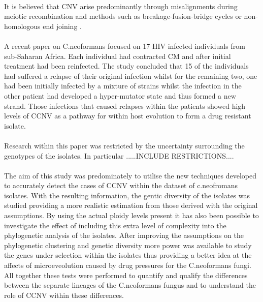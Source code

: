 \documentclass[11pt]{article}
\begin{document}
\paragraph{}It is believed that CNV arise predominantly through misalignments during meiotic recombination and methods such as breakage-fusion-bridge cycles or non-homologous end joining \autocite{Hastings2010}. 
\paragraph{}A recent paper on C.neoformans \autocite{Rhodes2017} focused on 17 HIV infected individuals from sub-Saharan Africa. Each individual had contracted CM and after initial treatment had been reinfected. The study concluded that 15 of the individuals had suffered a relapse of their original infection whilst for the remaining two, one had been initially infected by a mixture of strains whilst the infection in the other patient had developed a hyper-mutator state and thus formed a new strand. Those infections that caused relapses within the patients showed high levels of CCNV as a pathway for within host evolution to form a drug resistant isolate. 
\paragraph{}Research within this paper was restricted by the uncertainty surrounding the genotypes of the isolates. In particular .....INCLUDE RESTRICTIONS.... 
\paragraph{}The aim of this study was predominately to utilise the new techniques developed to accurately detect the cases of CCNV within the dataset of c.neofromans isolates. With the resulting information, the gentic diversity of the isolates was studied providing a more realistic estimation from those derived with the original assumptions. By using the actual ploidy levels present it has also been possible to investigate the effect of including this extra level of complexity into the phylogenetic analysis of the isolates. After improving the assumptions on the phylogenetic clustering and genetic diversity more power was available to study the genes under selection within the isolates thus providing a better idea at the affects of microeveolution caused by drug pressures for the C.neoformans fungi. All together these tests were performed to quantify and qualify the differences between the separate lineages of the C.neoformans fungus and to understand the role of CCNV within these differences.  
\end{document}
